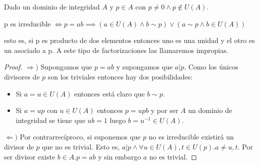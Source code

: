 \begin{proposition}
Dado un dominio de integridad $A$ y $p \in A$ con $p \neq 0 \land p \notin U(A)$. 

p es irreducible $\iff p = ab \implies (a \in U(A) \land b \sim p) \lor (a \sim p \land b \in U(A))$ 

esto es, si p es producto de dos elementos entonces uno es una unidad y el otro es un asociado a p. A este tipo de factorizaciones las llamaremos impropias. 
\end{proposition}
\begin{proof}
$\Rightarrow)$ Supongamos que $p = ab$ y supongamos que $a | p$. Como los únicos divisores de $p$ son los triviales entonces hay dos posibilidades:

\begin{itemize}
\item Si $a = u \in U(A)$ entonces está claro que $b \sim p$. 
\item Si $a = up$ con $u \in U(A)$ entonces $p = upb$ y por ser $A$ un dominio de integridad se tiene que $ub = 1$ luego $b = u^{-1} \in U(A)$. 
\end{itemize}

$\Leftarrow)$ Por contrarrecíproco, si suponemos que $p$ no es irreducible existirá un divisor de $p$ que no es trivial. Esto es, $a|p \land \forall u \in U(A),t \in U(p).a \neq u,t$. Por ser divisor existe $b \in A. p = ab$ y sin embargo $a$ no es trivial. 
\end{proof}

